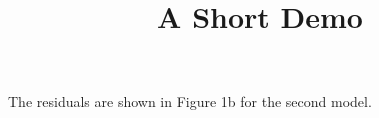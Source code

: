 \documentclass[article]{jss}
\title{A Short Demo}
\begin{document}
The residuals are shown in Figure 1b for the second model.
\end{document}
